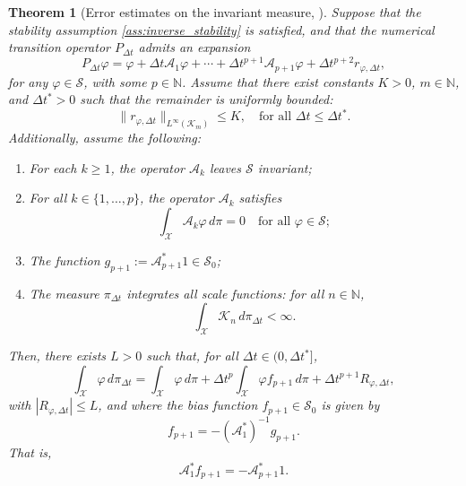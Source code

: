 \documentclass[11pt, twoside]{report}
\newtheorem{theorem}{Theorem}[section]
\begin{document}
\begin{theorem}[Error estimates on the invariant measure, \texorpdfstring{\cite[Theorem~3.3]{Lelievre2016-hx}}{}]
    \label{thm:error-inv-measure}
    Suppose that the stability assumption \ref{ass:inverse_stability} is satisfied, and that the numerical transition operator $P_{\Delta t}$ admits an expansion
    \begin{equation} \label{A_expansion}
        P_{\Delta t} \varphi = \varphi + \Delta t \mathcal{A}_1 \varphi + \cdots + \Delta t^{p+1} \mathcal{A}_{p+1} \varphi + \Delta t^{p+2} r_{\varphi,\Delta t},
    \end{equation}
    for any $\varphi \in \mathcal{S}$, with some $p \in \mathbb{N}$. Assume that there exist constants $K > 0$, $m \in \mathbb{N}$, and $\Delta t^* > 0$ such that the remainder is uniformly bounded:
    \[
    \| r_{\varphi,\Delta t} \|_{L^\infty(\mathcal{K}_m)} \leq K, \quad \text{for all } \Delta t \leq \Delta t^*.
    \]
    Additionally, assume the following:
    \begin{enumerate}
        \item For each $k \geq 1$, the operator $\mathcal{A}_k$ leaves $\mathcal{S}$ invariant;
        \item For all $k \in \{1, \ldots, p\}$, the operator $\mathcal{A}_k$ satisfies
        \begin{equation} \label{Ak_mean_zero}
            \int_\mathcal{X} \mathcal{A}_k \varphi \, d\pi = 0 \quad \text{for all } \varphi \in \mathcal{S};
        \end{equation}
        \item The function $g_{p+1} := \mathcal{A}_{p+1}^* 1 \in \mathcal{S}_0$;
        \item The measure $\pi_{\Delta t}$ integrates all scale functions: for all $n \in \mathbb{N}$,
        \[
        \int_\mathcal{X} \mathcal{K}_n \, d\pi_{\Delta t} < \infty.
        \]
    \end{enumerate}
    Then, there exists $L > 0$ such that, for all $\Delta t \in (0, \Delta t^*]$,
    \begin{equation} \label{bias_error_estimate}
        \int_\mathcal{X} \varphi \, d\pi_{\Delta t} = \int_\mathcal{X} \varphi \, d\pi + \Delta t^p \int_\mathcal{X} \varphi f_{p+1} \, d\pi + \Delta t^{p+1} R_{\varphi,\Delta t},
    \end{equation}
    with $|R_{\varphi,\Delta t}| \leq L$, and where the bias function $f_{p+1} \in \mathcal{S}_0$ is given by
    \[
    f_{p+1} = -(\mathcal{A}_1^*)^{-1} g_{p+1}.
    \]
    That is,
    \[
    \mathcal{A}_1^* f_{p+1} = -\mathcal{A}_{p+1}^* 1.
    \]
\end{theorem}
\end{document}
